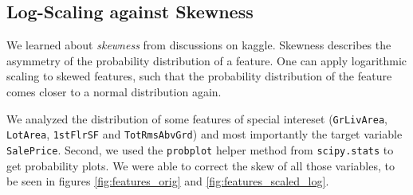 \subsection{Log-Scaling against Skewness}

We learned about \emph{skewness} from discussions on kaggle. Skewness describes the asymmetry of the probability distribution of a feature. One can apply logarithmic scaling to skewed features, such that the probability distribution of the feature comes closer to a normal distribution again.

We analyzed the distribution of some features of special intereset (\texttt{GrLivArea}, \texttt{LotArea}, \texttt{1stFlrSF} and \texttt{TotRmsAbvGrd}) and most importantly the target variable \texttt{SalePrice}. Second, we used the \texttt{probplot} helper method from \texttt{scipy.stats} to get probability plots. We were able to correct the skew of all those variables, to be seen in figures \ref{fig:features_orig} and \ref{fig:features_scaled_log}.

